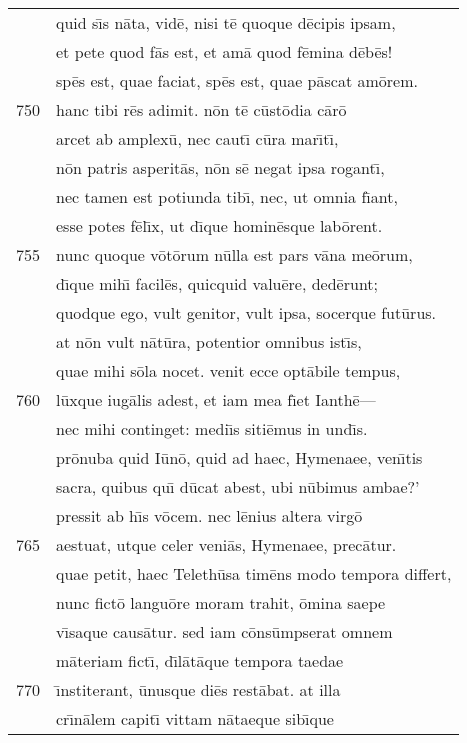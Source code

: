 \documentclass[paper=6in:9in,pagesize=pdftex,
               headinclude=on,footinclude=on,12pt]{scrbook}
\begin{document}
\begin{longtable}[p]{ r l }
 & quid s\={\i}s n\=ata, vid\=e, nisi t\=e quoque d\=ecipis ipsam,\\ 
 & et pete quod f\=as est, et am\=a quod f\=emina d\=eb\=es!\\ 
 & sp\=es est, quae faciat, sp\=es est, quae p\=ascat am\=orem.\\ 
750 & hanc tibi r\=es adimit. n\=on t\=e c\=ust\=odia c\=ar\=o\\ 
 & arcet ab amplex\=u, nec caut\={\i} c\=ura mar\={\i}t\={\i},\\ 
 & n\=on patris asperit\=as, n\=on s\=e negat ipsa rogant\={\i},\\ 
 & nec tamen est potiunda tib\={\i}, nec, ut omnia f\={\i}ant,\\ 
 & esse potes f\=el\={\i}x, ut d\={\i}que homin\=esque lab\=orent.\\ 
755 & nunc quoque v\=ot\=orum n\=ulla est pars v\=ana me\=orum,\\ 
 & d\={\i}que mih\={\i} facil\=es, quicquid valu\=ere, ded\=erunt;\\ 
 & quodque ego, vult genitor, vult ipsa, socerque fut\=urus.\\ 
 & at n\=on vult n\=at\=ura, potentior omnibus ist\={\i}s,\\ 
 & quae mihi s\=ola nocet. venit ecce opt\=abile tempus,\\ 
760 & l\=uxque iug\=alis adest, et iam mea f\={\i}et Ianth\=e—\\ 
 & nec mihi continget: medi\={\i}s siti\=emus in und\={\i}s.\\ 
 & pr\=onuba quid I\=un\=o, quid ad haec, Hymenaee, ven\={\i}tis\\ 
 & sacra, quibus qu\={\i} d\=ucat abest, ubi n\=ubimus ambae?'\\ 
 & pressit ab h\={\i}s v\=ocem. nec l\=enius altera virg\=o\\ 
765 & aestuat, utque celer veni\=as, Hymenaee, prec\=atur.\\ 
 & quae petit, haec Teleth\=usa tim\=ens modo tempora differt,\\ 
 & nunc fict\=o langu\=ore moram trahit, \=omina saepe\\ 
 & v\={\i}saque caus\=atur. sed iam c\=ons\=umpserat omnem\\ 
 & m\=ateriam fict\={\i}, d\={\i}l\=at\=aque tempora taedae\\ 
770 & \={\i}nstiterant, \=unusque di\=es rest\=abat. at illa\\ 
 & cr\={\i}n\=alem capit\={\i} vittam n\=ataeque sib\={\i}que\\ 

\end{longtable}
\end{document}
